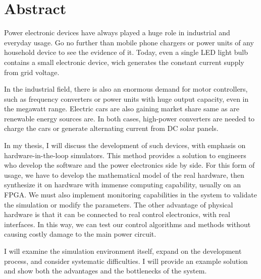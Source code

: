\chapter*{Abstract}

Power electronic devices have always played a huge role in industrial and everyday usage. Go no further than mobile phone chargers or power units of any household device to see the evidence of it. Today, even a single LED light bulb contains a small electronic device, wich generates the constant current supply from grid voltage.
 
In the industrial field, there is also an enormous demand for motor controllers, such as frequency converters or power units with huge output capacity, even in the megawatt range. Electric cars are also gaining market share same as are renewable energy sources are. In both cases, high-power converters are needed to charge the cars or generate alternating current from DC solar panels.
 
In my thesis, I will discuss the development of such devices, with emphasis on hardware-in-the-loop simulators. This method provides a solution to engineers who develop the software and the power electronics side by side. For this form of usage, we have to develop the mathematical model of the real hardware, then synthesize it on hardware with immense computing capability, usually on an FPGA. We must also implement monitoring capabilities in the system to validate the simulation or modify the parameters. The other advantage of physical hardware is that it can be connected to real control electronics, with real interfaces. In this way, we can test our control algorithms and methods without causing costly damage to the main power circuit. 
 
I will examine the simulation environment itself, expand on the development process, and consider systematic difficulties. I will provide an example solution and show both the advantages and the bottlenecks of the system.


\vfill
\selectthesislanguage

\setcounter{romanPage}{\value{page}}
